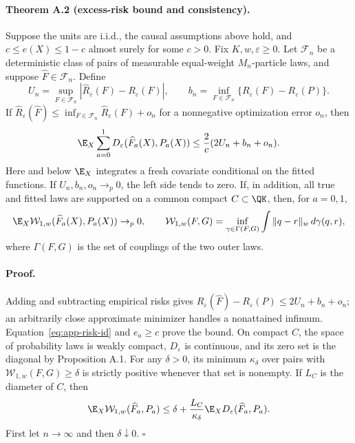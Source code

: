 \paragraph{Theorem A.2 (excess-risk bound and consistency).}
Suppose the units are i.i.d., the causal assumptions above hold, and $c\leq e(X)\leq1-c$ almost surely for some $c>0$. Fix $K,w,\varepsilon\geq0$. Let $\mathcal F_n$ be a deterministic class of pairs of measurable equal-weight $M_n$-particle laws, and suppose $\widehat F\in\mathcal F_n$. Define
\[
 U_n=\sup_{F\in\mathcal F_n}|\widehat R_\varepsilon(F)-R_\varepsilon(F)|,\qquad
 b_n=\inf_{F\in\mathcal F_n}\{R_\varepsilon(F)-R_\varepsilon(P)\}.
\]
If $\widehat R_\varepsilon(\widehat F)\leq\inf_{F\in\mathcal F_n}\widehat R_\varepsilon(F)+o_n$ for a nonnegative optimization error $o_n$, then
\begin{equation}
 \E_X\sum_{a=0}^1D_\varepsilon(\widehat F_a(X),P_a(X))
 \leq\frac{2}{c}(2U_n+b_n+o_n).
 \label{eq:app-oracle}
\end{equation}
Here and below $\E_X$ integrates a fresh covariate conditional on the fitted functions. If $U_n,b_n,o_n\to_p0$, the left side tends to zero. If, in addition, all true and fitted laws are supported on a common compact $C\subset\QK$, then, for $a=0,1$,
\begin{equation}
 \E_X\mathcal W_{1,w}(\widehat F_a(X),P_a(X))\to_p0,\qquad
 \mathcal W_{1,w}(F,G)=\inf_{\gamma\in\Gamma(F,G)}\int\|q-r\|_w\,d\gamma(q,r),
 \label{eq:app-law-consistency}
\end{equation}
where $\Gamma(F,G)$ is the set of couplings of the two outer laws.

\paragraph{Proof.}
Adding and subtracting empirical risks gives $R_\varepsilon(\widehat F)-R_\varepsilon(P)\leq2U_n+b_n+o_n$; an arbitrarily close approximate minimizer handles a nonattained infimum. Equation~\eqref{eq:app-risk-id} and $e_a\geq c$ prove the bound. On compact $C$, the space of probability laws is weakly compact, $D_\varepsilon$ is continuous, and its zero set is the diagonal by Proposition A.1. For any $\delta>0$, its minimum $\kappa_\delta$ over pairs with $\mathcal W_{1,w}(F,G)\geq\delta$ is strictly positive whenever that set is nonempty. If $L_C$ is the diameter of $C$, then
\[
 \E_X\mathcal W_{1,w}(\widehat F_a,P_a)
 \leq\delta+\frac{L_C}{\kappa_\delta}\E_XD_\varepsilon(\widehat F_a,P_a).
\]
First let $n\to\infty$ and then $\delta\downarrow0$. $\square$

